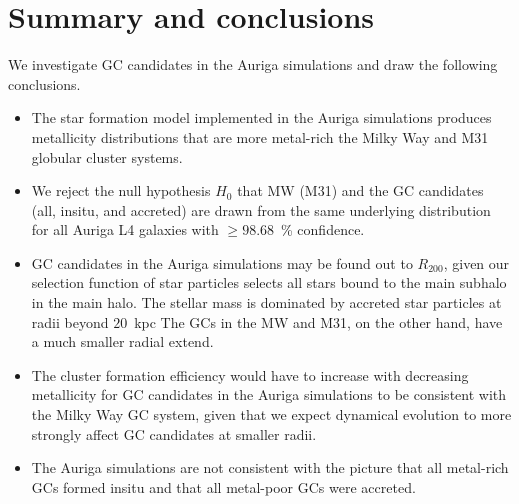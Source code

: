 \documentclass[a4paper,fleqn,usenatbib]{mnras}
\begin{document}
% 
% 
% 



\section{Summary and conclusions}
\label{sec:conclusions}

We investigate GC candidates in the Auriga simulations and draw the following
conclusions.

\begin{itemize}
    \item The star formation model implemented in the Auriga simulations produces
    metallicity distributions that are more metal-rich the Milky Way and M31 
    globular cluster systems.
    \item We reject the null hypothesis $H_0$ that MW (M31) and the GC candidates
    (all, insitu, and accreted) are drawn from the same underlying distribution
    for all Auriga L4 galaxies with $\geq 98.68$~\% confidence.
    \item GC candidates in the Auriga simulations may be found out to $R_{200}$,
    given our selection function of star particles selects all stars bound to the
    main subhalo in the main halo. The stellar mass is dominated by accreted star
    particles at radii beyond $20$~kpc The GCs in the MW and M31, on the other hand,
    have a much smaller radial extend. 
    \item The cluster formation efficiency would have to increase with decreasing
    metallicity for GC candidates in the Auriga simulations to be consistent
    with the Milky Way GC system, given that we expect dynamical evolution to more strongly affect GC
    candidates at smaller radii.
    \item The Auriga simulations are not consistent with the picture that all 
    metal-rich GCs formed insitu and that all metal-poor GCs were accreted.
\end{itemize}
\end{document}
